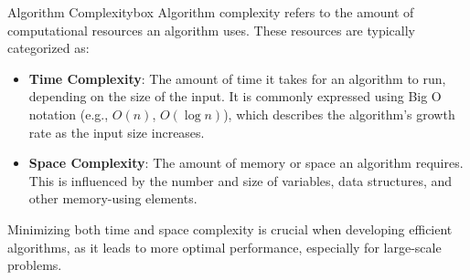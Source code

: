 \begin{prettyBox}{Algorithm Complexity}{box}
Algorithm complexity refers to the amount of computational resources an algorithm uses. These resources are typically categorized as:

\begin{itemize}
    \item \textbf{Time Complexity}: The amount of time it takes for an algorithm to run, depending on the size of the input.
    It is commonly expressed using Big O notation (e.g., \(O(n)\), \(O(\log n)\)), which describes the algorithm's growth rate
    as the input size increases.
    
    \item \textbf{Space Complexity}: The amount of memory or space an algorithm requires. This is influenced by the number and 
    size of variables, data structures, and other memory-using elements.
\end{itemize}

Minimizing both time and space complexity is crucial when developing efficient algorithms, as it leads to more optimal performance, especially for large-scale problems.
\end{prettyBox}

